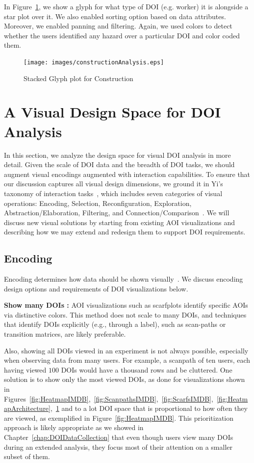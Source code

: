 In Figure~\ref{fig:constructionAnalysis}, we show a glyph for what type of DOI (e.g. worker) it is alongside a star plot over it. We also enabled sorting option based on data attributes. Moreover, we enabled panning and filtering. Again, we used colors to detect whether the users identified any hazard over a particular DOI and color coded them. 

\begin{figure}
  \centering
  \texttt{[image: images/constructionAnalysis.eps]}
  \caption{Stacked Glyph plot for Construction}
	\label{fig:constructionAnalysis}
\end{figure}

\section{A Visual Design Space for DOI Analysis}

In this section, we analyze the design space for visual DOI analysis in more detail. Given the scale of DOI data and the breadth of DOI tasks, we should augment visual encodings augmented with interaction capabilities. To ensure that our discussion captures all visual design dimensions, we ground it in Yi's taxonomy of interaction tasks~\cite{Yi07}, which includes seven categories of visual operations: Encoding, Selection, Reconfiguration, Exploration, Abstraction/Elaboration, Filtering, and Connection/Comparison~\cite{Yi07}. We will discuss new visual solutions by starting from existing AOI visualizations and describing how we may extend and redesign them to support DOI requirements. 

\subsection{Encoding}
\label{sec:Encoding}
Encoding determines how data should be shown visually~\cite{Yi07}. We discuss encoding design options and requirements of DOI visualizations below.

\textbf{Show many DOIs :} AOI visualizations such as scarfplots identify specific AOIs via distinctive colors. This method does not scale to many DOIs, and techniques that identify DOIs explicitly (e.g., through a label), such as scan-paths or transition matrices, are likely preferable. 

Also, showing all DOIs viewed in an experiment is not always possible, especially when observing data from many users. For example, a scanpath of ten users, each having viewed $100$ DOIs would have a thousand rows and be cluttered. One solution is to show only the most viewed DOIs, as done for visualizations shown in Figures~\ref{fig:HeatmapIMDB},~\ref{fig:ScanpathsIMDB},~\ref{fig:ScarfsIMDB},~\ref{fig:HeatmapArchitecture},~\ref{fig:constructionAnalysis} and to a lot DOI space that is proportional to how often they are viewed, as exemplified in Figure~\ref{fig:HeatmapIMDB}. This prioritization approach is likely appropriate as we showed in Chapter~\ref{chap:DOIDataCollection} that even though users view many DOIs during an extended analysis, they focus most of their attention on a smaller subset of them. 

